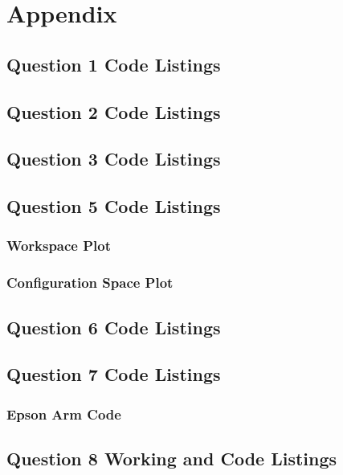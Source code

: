 \newpage
\renewcommand{\thesubsection}{\thesection.\arabic{subsection}}
\section{Appendix}
	\subsection{Question 1 Code Listings}
	
	
	\pagebreak
	\subsection{Question 2 Code Listings}
	
	
	\pagebreak
	\subsection{Question 3 Code Listings}
	
	
	\pagebreak
	\subsection{Question 5 Code Listings}
		\subsubsection{Workspace Plot}
		
		\subsubsection{Configuration Space Plot}
		
		
		
	
	\pagebreak
	\subsection{Question 6 Code Listings}
		
	\pagebreak
	\subsection{Question 7 Code Listings}
			\subsubsection{Epson Arm Code}
			
	\pagebreak
	\subsection{Question 8 Working and Code Listings}

